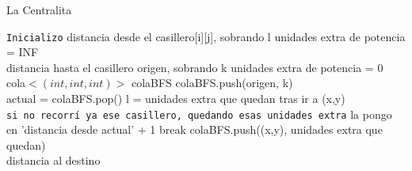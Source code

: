\documentclass[11pt, a4paper, twoside]{article}
\begin{document}
\begin{algorithm}[H]
\caption{La Centralita}\label{alg:ej3-centralita}
\begin{algorithmic}[1]

\Statex \texttt{Inicializo}
	  
		\State distancia desde el casillero[i][j], sobrando l unidades extra de potencia = INF
	\EndFor \\

\State distancia hasta el casillero origen, sobrando k unidades extra de potencia = 0 \\
\State cola$<(int, int, int)>$ colaBFS
\State colaBFS.push(origen, k) \\

   
\State actual = colaBFS.pop()
		    \State l = unidades extra que quedan tras ir a (x,y) \\
			\Statex \hspace{1cm} \texttt{si no recorrí ya ese casillero, quedando esas unidades extra}
				\State   la pongo en 'distancia desde actual' + 1
					\State break
				\EndIf
				\State colaBFS.push((x,y), unidades extra que quedan)
			\EndIf	
	\EndFor		
\EndWhile
\\
\State \Return distancia al destino

\end{algorithmic}
\end{algorithm}
\end{document}

